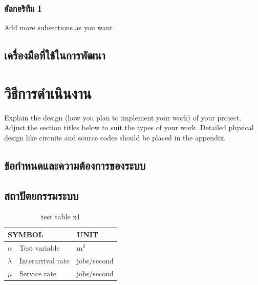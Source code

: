 \documentclass[12pt,oneside,openright,a4paper]{cpe-thai-project}
\begin{document}
\subsection{อัลกอริทึม I}
Add more subsections as you want.


\section{เครื่องมือที่ใช้ในการพัฒนา}

\chapter{วิธีการดำเนินงาน}

Explain the design (how you plan to implement your work) of your project. Adjust the section titles below to suit the types of your work. Detailed physical design like circuits and source codes should be placed in the appendix.

\section{ข้อกำหนดและความต้องการของระบบ}

\section{สถาปัตยกรรมระบบ}

\begin{table}[!h]
\centering
\caption{test table x1}\label{tbl:symbols}
\begin{tabular}{@{}p{}|p{}p{}}\hline
\multicolumn{2}{l}{\textbf{SYMBOL}}  & \textbf{UNIT} \\ \hline 
$\alpha$ & Test variable\hfill & m$^2$ \\
$\lambda$ & Interarrival rate\hfill &  jobs/second\\
$\mu$ & Service rate\hfill & jobs/second \\ \hline
\end{tabular}
\end{table}
\end{document}
